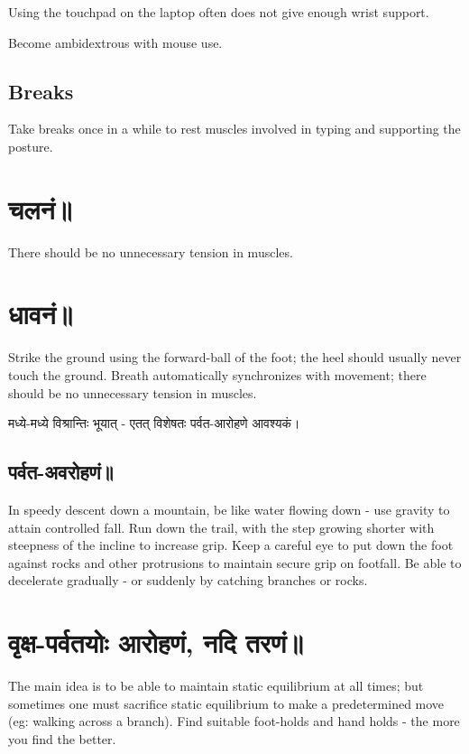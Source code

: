 \documentclass[oneside, article]{memoir}
\begin{document}
Using the touchpad on the laptop often does not give enough wrist support.

Become ambidextrous with mouse use.

\section{Breaks}
Take breaks once in a while to rest muscles involved in typing and supporting the posture.

\chapter{चलनं॥}
There should be no unnecessary tension in muscles.

\chapter{धावनं॥}
Strike the ground using the forward-ball of the foot; the heel should usually never touch the ground. Breath automatically synchronizes with movement; there should be no unnecessary tension in muscles.

मध्ये-मध्ये विश्रान्तिः भूयात् - एतत् विशेषतः पर्वत-आरोहणे आवश्यकं।

\section{पर्वत-अवरोहणं॥}
In speedy descent down a mountain, be like water flowing down - use gravity to attain controlled fall. Run down the trail, with the step growing shorter with steepness of the incline to increase grip. Keep a careful eye to put down the foot against rocks and other protrusions to maintain secure grip on footfall. Be able to decelerate gradually - or suddenly by catching branches or rocks.

\chapter{वृक्ष-पर्वतयोः आरोहणं, नदि तरणं॥}
The main idea is to be able to maintain static equilibrium at all times; but sometimes one must sacrifice static equilibrium to make a predetermined move (eg: walking across a branch). Find suitable foot-holds and hand holds - the more you find the better.
\end{document}
